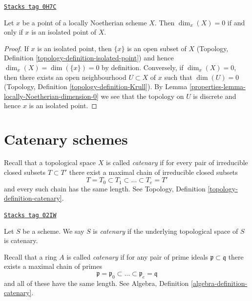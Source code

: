 \begin{lemma}
\label{properties-lemma-isolated-dim-0-locally-noetherian}
\href{https://stacks.math.columbia.edu/tag/0H7C}{\texttt{Stacks tag 0H7C}}

Let $x$ be a point of a locally Noetherian scheme $X$.
Then $\dim_x(X) = 0$ if and only if $x$ is an isolated point of $X$.
\end{lemma}

\begin{proof}

If $x$ is an isolated point, then $\{x\}$ is an open subset of $X$
(Topology, Definition \ref{topology-definition-isolated-point})
and hence $\dim_x(X) = \dim(\{x\}) = 0$ by definition. Conversely, if
$\dim_x(X) = 0$, then there exists an open neighbourhood $U \subset X$
of $x$ such that $\dim(U) = 0$
(Topology, Definition \ref{topology-definition-Krull}).
By Lemma \ref{properties-lemma-locally-Noetherian-dimension-0}
we see that the topology on $U$ is discrete and hence
$x$ is an isolated point.
\end{proof}

\section{Catenary schemes}
\label{properties-section-catenary}
Recall that a topological space $X$ is called {\it catenary} if
for every pair of irreducible closed subsets $T \subset T'$
there exist a maximal chain of irreducible closed subsets
$$
T = T_0 \subset T_1 \subset \ldots \subset T_e = T'
$$
and every such chain has the same length. See
Topology, Definition \ref{topology-definition-catenary}.

\begin{definition}[Catenary]
\label{properties-definition-catenary}
\href{https://stacks.math.columbia.edu/tag/02IW}{\texttt{Stacks tag 02IW}}

Let $S$ be a scheme. We say $S$ is {\it catenary} if the
underlying topological space of $S$ is catenary.
\end{definition}

Recall that a ring $A$ is called {\it catenary} if
for any pair of prime ideals $\mathfrak p \subset \mathfrak q$
there exists a maximal chain of primes
$$
\mathfrak p =
\mathfrak p_0 \subset \ldots \subset \mathfrak p_e
= \mathfrak q
$$
and all of these have the same length. See
Algebra, Definition \ref{algebra-definition-catenary}.

